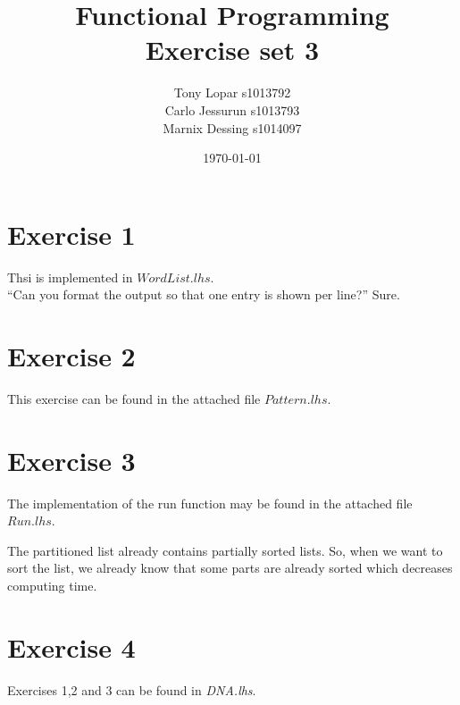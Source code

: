\documentclass{article}
\begin{document}
\title{Functional Programming \\ Exercise set 3}
\date{\today}
\author{Tony Lopar s1013792 \\ Carlo Jessurun s1013793 \\ Marnix Dessing s1014097}
\maketitle

\section*{Exercise 1}
Thsi is implemented in $WordList.lhs$.\\
``Can you format the output so that one entry is shown per line?'' Sure.

\section*{Exercise 2}
This exercise can be found in the attached file $Pattern.lhs$.

\section*{Exercise 3}
The implementation of the run function may be found in the attached file $Run.lhs$.

The partitioned list already contains partially sorted lists. So, when we want to sort the list, we already know that some parts are already sorted which decreases computing time.

\section*{Exercise 4}
Exercises 1,2 and 3 can be found in \emph{DNA.lhs}.
\end{document}
